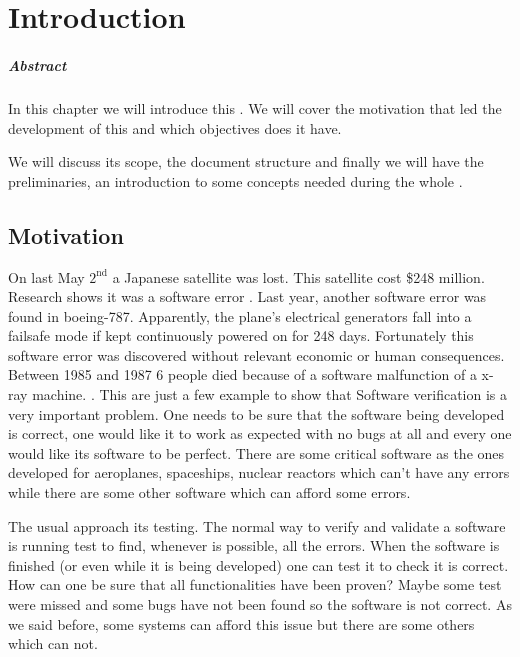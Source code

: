 \chapter{Introduction\label{chap:introduction}}

\paragraph{Abstract}

In this chapter we will introduce this \thisworkm.
%
We will cover the motivation that led the development of this \thisworkm and which objectives does it have.

We will discuss its scope, the document structure and finally we will have the preliminaries, an introduction to some concepts needed during the whole \thisworkm. 

\section{Motivation}

\label{Motivation}
On last May $\text{2}^{\text{nd}}$ a Japanese satellite was lost. This satellite cost \$248 million.
%
Research shows it was a software error \cite{japaneseSatellite}. 
%
Last year, another software error was found in boeing-787.
%
Apparently, the plane’s electrical generators fall into a failsafe mode if kept continuously powered on for 248 days. \cite{boein787}
%
Fortunately this software error was discovered without relevant economic or human consequences.
%
Between 1985 and 1987 6 people died because of a software malfunction of a x-ray machine. \cite{xraykill}.
%
This are just a few example to show that Software verification is a very important problem.
%
One needs to be sure that the software being developed is correct, one would like it to work as expected with no bugs at all and every one would like its software to be perfect.
%
There are some critical software as the ones developed for aeroplanes, spaceships, nuclear reactors which can't have any errors while there are some other software which can afford some errors.


The usual approach its testing.
% 
The normal way to verify and validate a software is running test to find, whenever is possible, all the errors.
% 
When the software is finished (or even while it is being developed) one can test it to check it is correct.
%
How can one be sure that all functionalities have been proven? Maybe some test were missed and some bugs have not been found so the software is not correct.
%
As we said before, some systems can afford this issue but there are some others which can not.


